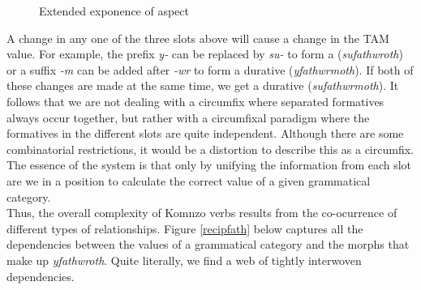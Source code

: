 \begin{figure}
\begin{center}%
\end{center}
\caption{Extended exponence of aspect}
\label{extendfath}
\end{figure}%

A change in any one of the three slots above will cause a change in the TAM value. For example, the prefix \emph{y-} can be replaced by \emph{su-} to form a   (\emph{sufathwroth}) or a suffix \emph{-m} can be added after \emph{-wr} to form a  durative (\emph{yfathwrmoth}). If both of these changes are made at the same time, we get a  durative (\emph{sufathwrmoth}). It follows that we are not dealing with a circumfix where separated formatives always occur together, but rather with a circumfixal paradigm where the formatives in the different slots are quite independent. Although there are some combinatorial restrictions, it would be a distortion to describe this as a circumfix. The essence of the system is that only by unifying the information from each slot are we in a position to calculate the correct value of a given grammatical category.\\

Thus, the overall complexity of Komnzo verbs results from the co-ocurrence of different types of  relationships. Figure \ref{recipfath} below captures all the dependencies between the values of a grammatical category and the morphs that make up \emph{yfathwroth}. Quite literally, we find a web of tightly interwoven dependencies.

